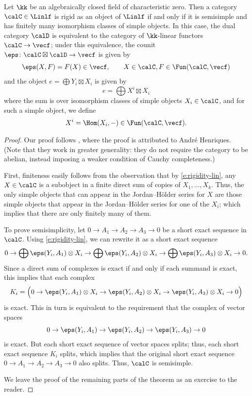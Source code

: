 \begin{theorem}\label{t:dualizable-linear}
  Let $\kk$ be an algebraically closed field of characteristic zero. Then a
  category $\calC\in \Linlf$ is rigid as an object of $\Linlf$ if and only if it
  is semisimple and has finitely many isomorphism classes of simple objects. In
  this case, the dual category $\calD$ is equivalent to the category of
  $\kk$-linear functors $\calC\to \vecf$; under this equivalence, the counit
  $\eps\colon \calC\boxtimes\calD\to \vecf$ is given by
  $$
    \eps(X,F) = F(X)\in \vecf,\qquad X\in \calC, F\in \Fun(\calC, \vecf)
  $$
  and the object $e=\bigoplus Y_i\boxtimes X_i$ is given by
  $$
    e=\bigoplus X^i \boxtimes X_i
  $$
  where the sum is over isomorphism classes of simple objects $X_i\in \calC$,
  and for such a simple object, we define
  $$
    X^i=\Hom(X_i, -)\in \Fun(\calC, \vecf).
  $$
\end{theorem}
\begin{proof}
  Our proof follows \cite[Section A.6]{bdspv}, where the proof is attributed
  to Andr\'e Henriques. (Note that they work in greater generality: they do not
  require the category to be abelian, instead imposing a weaker condition of
  Cauchy completeness.)


  First, finiteness easily follows from the observation that by
  \eqref{e:rigidity-lin}, any $X\in \calC$ is a subobject in a finite direct sum
  of copies of $X_1, \dots, X_k$. Thus, the only simple objects that can appear
  in the Jordan--H\"older series for $X$ are those simple objects that appear in
  the Jordan--H\"older series for one of the $X_i$; which implies that there are only
  finitely many of them.

  To prove semisimplicity, let $0\to A_1\to A_2\to A_3\to 0$ be a short exact
  sequence in $\calC$. Using \eqref{e:rigidity-lin}, we can rewrite it as a
  short exact sequence
  $$
  0 \to \bigoplus \eps(Y_i, A_1)\otimes X_i
    \to \bigoplus \eps(Y_i, A_2)\otimes X_i
    \to \bigoplus \eps(Y_i, A_3)\otimes X_i
  \to 0.
  $$
  Since a direct sum of complexes is exact if and only if each summand is
  exact, this implies that each complex
  $$
  K_i = \Bigl(
      0 \to  \eps(Y_i, A_1)\otimes X_i
          \to  \eps(Y_i, A_2)\otimes X_i
          \to \eps(Y_i, A_3)\otimes X_i
        \to 0
        \Bigr)
  $$
  is exact. This in turn is equivalent to the requirement that the complex of
  vector spaces
  $$
    0 \to  \eps(Y_i, A_1)
            \to  \eps(Y_i, A_2)
            \to \eps(Y_i, A_3)
    \to 0
  $$
  is exact. But each short exact sequence of vector spaces splits; thus, each
  short exact sequence $K_i$ splits, which implies that the original short
  exact sequence $0\to A_1\to A_2\to A_3\to 0$ also splits. Thus, $\calC$ is
  semisimple.

  We leave the proof of the remaining parts of the theorem as an exercise to the
  reader.
 \end{proof}

